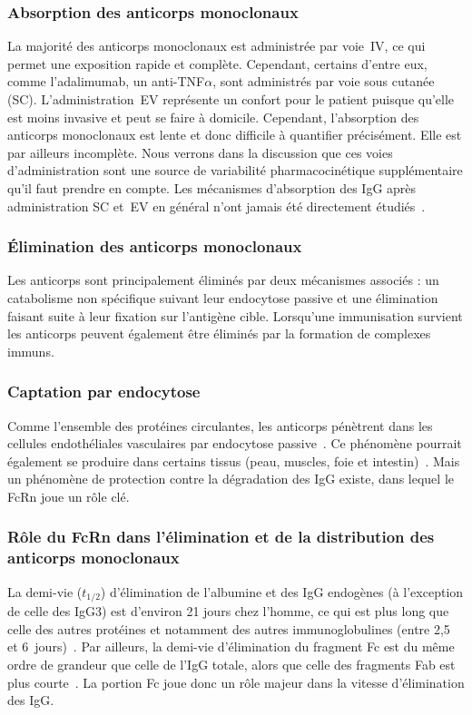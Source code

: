 \subsubsection{Absorption des anticorps monoclonaux}
La majorité des anticorps monoclonaux est administrée par voie~\gls{IV}, ce qui permet une exposition rapide et complète. Cependant, certains d'entre eux, comme l'adalimumab, un anti-TNF$\alpha$, sont administrés par voie sous cutanée (SC). L'administration~\gls{EV} représente un confort pour le patient puisque qu'elle est moins invasive et peut se faire à domicile. Cependant, l'absorption des anticorps monoclonaux est lente et donc difficile à quantifier précisément. Elle est par ailleurs incomplète. Nous verrons dans la discussion que ces voies d'administration sont une source de variabilité pharmacocinétique supplémentaire qu'il faut prendre en compte. Les mécanismes d'absorption des IgG après administration SC et~\gls{EV} en général n'ont jamais été directement étudiés~\citep{REF18}. 

\subsubsection{Élimination des anticorps monoclonaux}
Les anticorps sont principalement éliminés par deux mécanismes associés : un catabolisme non spécifique suivant leur endocytose passive et une élimination faisant suite à leur fixation sur l'antigène cible. Lorsqu'une immunisation survient les anticorps peuvent également être éliminés par la formation de complexes immuns.

\subsubsection{Captation par endocytose}
Comme l'ensemble des protéines circulantes, les anticorps pénètrent dans les cellules endothéliales vasculaires par endocytose passive~\citep{REF7, REF18}. Ce phénomène pourrait également se produire dans certains tissus (peau, muscles, foie et intestin)~\citep{REF19}. Mais un phénomène de protection contre la dégradation des IgG existe, dans lequel le FcRn joue un rôle clé.

\subsubsection{Rôle du FcRn dans l'élimination et de la distribution des anticorps monoclonaux}
La demi-vie ($t_{1/2}$) d'élimination de l'albumine et des IgG endogènes (à l'exception de celle des IgG3) est d'environ 21 jours chez l'homme, ce qui est plus long que celle des autres protéines et notamment des autres immunoglobulines (entre 2,5 et 6~jours)~\citep{REF20, REF21}. Par ailleurs, la demi-vie d'élimination du fragment Fc est du même ordre de grandeur que celle de l'IgG totale, alors que celle des fragments Fab est plus courte~\citep{REF22}. La portion Fc joue donc un rôle majeur dans la vitesse d'élimination des IgG.

